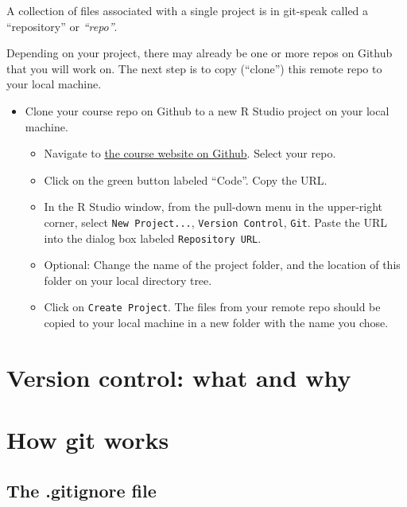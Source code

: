 \documentclass[
]{book}
\providecommand{\tightlist}{%
  \setlength{\itemsep}{0pt}\setlength{\parskip}{0pt}}
\begin{document}
A collection of files associated with a single project is in git-speak called a ``repository'' or \emph{``repo''}.

Depending on your project, there may already be one or more repos on Github that you will work on. The next step is to copy (``clone'') this remote repo to your local machine.

\begin{itemize}
\tightlist
\item
  Clone your course repo on Github to a new R Studio project on your local machine.

  \begin{itemize}
  \tightlist
  \item
    Navigate to \href{https://github.com/uva-eng-time-series-sp21}{the course website on Github}. Select your repo.
  \item
    Click on the green button labeled ``Code''. Copy the URL.
  \item
    In the R Studio window, from the pull-down menu in the upper-right corner, select \texttt{New\ Project...}, \texttt{Version\ Control}, \texttt{Git}. Paste the URL into the dialog box labeled \texttt{Repository\ URL}.
  \item
    Optional: Change the name of the project folder, and the location of this folder on your local directory tree.
  \item
    Click on \texttt{Create\ Project}. The files from your remote repo should be copied to your local machine in a new folder with the name you chose.
  \end{itemize}
\end{itemize}

\hypertarget{version-control-what-and-why}{%
\section{Version control: what and why}\label{version-control-what-and-why}}

\hypertarget{how-git-works}{%
\section{How git works}\label{how-git-works}}

\hypertarget{the-.gitignore-file}{%
\subsection{The .gitignore file}\label{the-.gitignore-file}}
\end{document}
